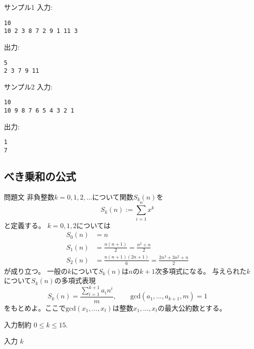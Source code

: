 \documentclass[a4paper,twoside,onecolumn,openany,article,10pt]{memoir}
\theoremstyle{remark}
\begin{document}
\begin{itembox}[l]{サンプル1}
入力:
\begin{verbatim}
10
10 2 3 8 7 2 9 1 11 3
\end{verbatim}
出力:
\begin{verbatim}
5
2 3 7 9 11
\end{verbatim}
\end{itembox}

\begin{itembox}[l]{サンプル2}
入力:
\begin{verbatim}
10
10 9 8 7 6 5 4 3 2 1
\end{verbatim}
出力:
\begin{verbatim}
1
7
\end{verbatim}
\end{itembox}
\fi


\clearpage
\subsection{べき乗和の公式}
\begin{itembox}[l]{問題文}
非負整数$k=0, 1,2,\dotsc$について関数$S_k(n)$を
\begin{equation*}
S_k(n) := \sum_{i=1}^n x^k
\end{equation*}
と定義する。
$k=0,1,2$については
\begin{align*}
S_0(n) &= n\\
S_1(n) &= \frac{n(n+1)}2 = \frac{n^2 + n}2\\
S_2(n) &= \frac{n(n+1)(2n+1)}6 = \frac{2n^3 + 3n^2 + n}2
\end{align*}
が成り立つ。
一般の$k$について$S_k(n)$は$n$の$k+1$次多項式になる。
与えられた$k$について$S_k(n)$の多項式表現
\begin{equation*}
S_k(n) = \frac{\sum_{i=1}^{k+1} a_i n^i}{m},\qquad \mathrm{gcd}(a_1,\dotsc,a_{k+1},m) = 1
\end{equation*}
をもとめよ。ここで$\mathrm{gcd}(x_1,\dotsc,x_t)$は整数$x_1,\dotsc,x_t$の最大公約数とする。
\end{itembox}

\begin{itembox}[l]{入力制約}
$0\le k\le 15$.
\end{itembox}

\begin{itembox}[l]{入力}
$k$
\end{itembox}
\end{document}
